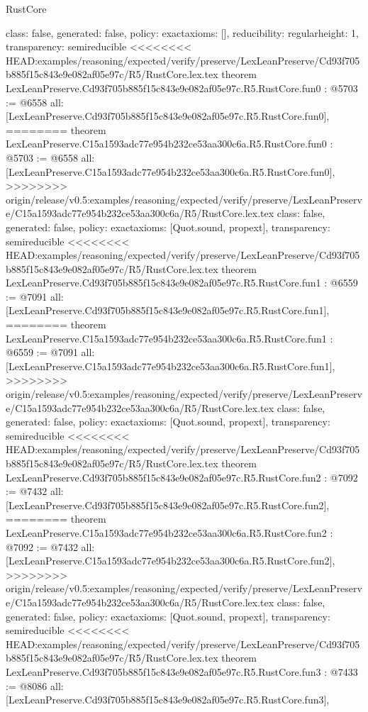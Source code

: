 \begin{lexlean}{RustCore}
\begin{coremodule}
{\begin{coremodule}
{{{  class: false,
  generated: false,
  policy: exact{axioms: []},
  reducibility: regular{height: 1},
  transparency: semireducible
}
<<<<<<<< HEAD:examples/reasoning/expected/verify/preserve/LexLeanPreserve/Cd93f705b885f15c843e9e082af05e97c/R5/RustCore.lex.tex
theorem LexLeanPreserve.Cd93f705b885f15c843e9e082af05e97c.R5.RustCore.fun0 : @5703 := @6558 {
  all: [LexLeanPreserve.Cd93f705b885f15c843e9e082af05e97c.R5.RustCore.fun0],
========
theorem LexLeanPreserve.C15a1593adc77e954b232ce53aa300c6a.R5.RustCore.fun0 : @5703 := @6558 {
  all: [LexLeanPreserve.C15a1593adc77e954b232ce53aa300c6a.R5.RustCore.fun0],
>>>>>>>> origin/release/v0.5:examples/reasoning/expected/verify/preserve/LexLeanPreserve/C15a1593adc77e954b232ce53aa300c6a/R5/RustCore.lex.tex
  class: false,
  generated: false,
  policy: exact{axioms: [Quot.sound, propext]},
  transparency: semireducible
}
<<<<<<<< HEAD:examples/reasoning/expected/verify/preserve/LexLeanPreserve/Cd93f705b885f15c843e9e082af05e97c/R5/RustCore.lex.tex
theorem LexLeanPreserve.Cd93f705b885f15c843e9e082af05e97c.R5.RustCore.fun1 : @6559 := @7091 {
  all: [LexLeanPreserve.Cd93f705b885f15c843e9e082af05e97c.R5.RustCore.fun1],
========
theorem LexLeanPreserve.C15a1593adc77e954b232ce53aa300c6a.R5.RustCore.fun1 : @6559 := @7091 {
  all: [LexLeanPreserve.C15a1593adc77e954b232ce53aa300c6a.R5.RustCore.fun1],
>>>>>>>> origin/release/v0.5:examples/reasoning/expected/verify/preserve/LexLeanPreserve/C15a1593adc77e954b232ce53aa300c6a/R5/RustCore.lex.tex
  class: false,
  generated: false,
  policy: exact{axioms: [Quot.sound, propext]},
  transparency: semireducible
}
<<<<<<<< HEAD:examples/reasoning/expected/verify/preserve/LexLeanPreserve/Cd93f705b885f15c843e9e082af05e97c/R5/RustCore.lex.tex
theorem LexLeanPreserve.Cd93f705b885f15c843e9e082af05e97c.R5.RustCore.fun2 : @7092 := @7432 {
  all: [LexLeanPreserve.Cd93f705b885f15c843e9e082af05e97c.R5.RustCore.fun2],
========
theorem LexLeanPreserve.C15a1593adc77e954b232ce53aa300c6a.R5.RustCore.fun2 : @7092 := @7432 {
  all: [LexLeanPreserve.C15a1593adc77e954b232ce53aa300c6a.R5.RustCore.fun2],
>>>>>>>> origin/release/v0.5:examples/reasoning/expected/verify/preserve/LexLeanPreserve/C15a1593adc77e954b232ce53aa300c6a/R5/RustCore.lex.tex
  class: false,
  generated: false,
  policy: exact{axioms: [Quot.sound, propext]},
  transparency: semireducible
}
<<<<<<<< HEAD:examples/reasoning/expected/verify/preserve/LexLeanPreserve/Cd93f705b885f15c843e9e082af05e97c/R5/RustCore.lex.tex
theorem LexLeanPreserve.Cd93f705b885f15c843e9e082af05e97c.R5.RustCore.fun3 : @7433 := @8086 {
  all: [LexLeanPreserve.Cd93f705b885f15c843e9e082af05e97c.R5.RustCore.fun3],
}}}}}}
\end{coremodule}}
\end{coremodule}
\end{lexlean}
